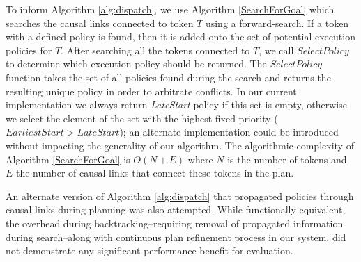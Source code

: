 
To inform Algorithm \ref{alg:dispatch}, we use Algorithm
\ref{SearchForGoal} which searches the causal links connected to token
$T$ using a forward-search.  If a token with a defined policy is
found, then it is added onto the set of potential execution policies
for $T$.  After searching all the tokens connected to $T$, we call
$SelectPolicy$ to determine which execution policy should be
returned. The $SelectPolicy$ function takes the set of all policies
found during the search and returns the resulting unique policy in
order to arbitrate conflicts. In our current implementation we always
return {\em LateStart} policy if this set is empty, otherwise we
select the element of the set with the highest fixed priority
($EarliestStart > LateStart$); an alternate implementation could be
introduced without impacting the generality of our algorithm.  The
algorithmic complexity of Algorithm \ref{SearchForGoal} is $O(N+E)$
where $N$ is the number of tokens and $E$ the number of causal links
that connect these tokens in the plan.

An alternate version of Algorithm \ref{alg:dispatch} that propagated
policies through causal links during planning was also
attempted. While functionally equivalent, the overhead during
backtracking--requiring removal of propagated information during
search--along with continuous plan refinement process in our system,
did not demonstrate any significant performance benefit for
evaluation.



